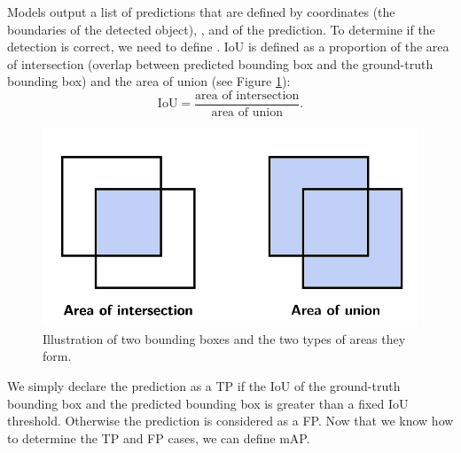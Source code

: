 Models output a list of predictions that are defined by  coordinates (the boundaries of the detected object), , and  of the prediction. To determine if the detection is correct, we need to define . IoU is defined as a proportion of the area of intersection (overlap between predicted bounding box and the ground-truth bounding box) and the area of union (see Figure \ref{fig:iou}):
$$
    \text{IoU} = \frac{\text{area of intersection}}{\text{area of union}}.
$$

\begin{figure}[h]
    \centering
    \includegraphics[width=0.6\linewidth]{Sources/Figures/iou.png}
    \caption{Illustration of two bounding boxes and the two types of areas they form.}
    \label{fig:iou}
\end{figure}
We simply declare the prediction as a TP if the IoU of the ground-truth bounding box and the predicted bounding box is greater than a fixed IoU threshold. Otherwise the prediction is considered as a FP. Now that we know how to determine the TP and FP cases, we can define mAP.

